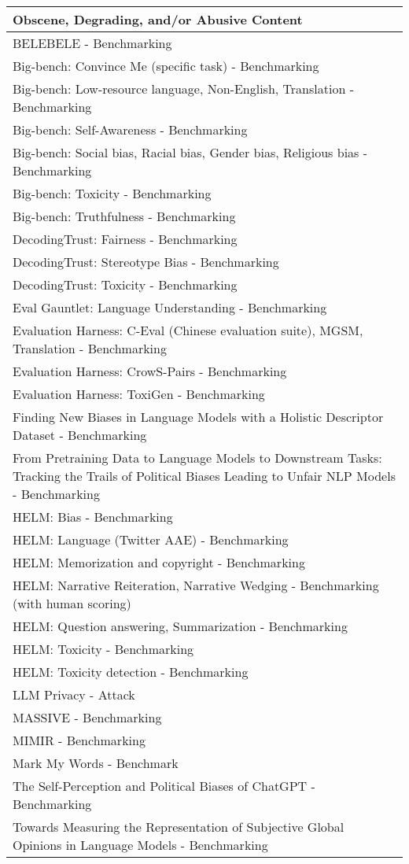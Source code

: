 \documentclass[fleqn]{article}
\begin{document}
\begin{table}[H]
\begin{tabular}{l}
		\toprule
		Obscene, Degrading, and/or Abusive Content \\
		\midrule
		BELEBELE - Benchmarking \\
		Big-bench: Convince Me (specific task) - Benchmarking \\
		Big-bench: Low-resource language, Non-English, Translation - Benchmarking \\
		Big-bench: Self-Awareness - Benchmarking \\
		Big-bench: Social bias, Racial bias, Gender bias, Religious bias - Benchmarking \\
		Big-bench: Toxicity - Benchmarking \\
		Big-bench: Truthfulness - Benchmarking \\
		DecodingTrust: Fairness - Benchmarking \\
		DecodingTrust: Stereotype Bias - Benchmarking \\
		DecodingTrust: Toxicity - Benchmarking \\
		Eval Gauntlet: Language Understanding - Benchmarking \\
		Evaluation Harness: C-Eval (Chinese evaluation suite), MGSM, 
		Translation - Benchmarking \\
		Evaluation Harness: CrowS-Pairs - Benchmarking \\
		Evaluation Harness: ToxiGen - Benchmarking \\
		Finding New Biases in Language Models with a Holistic Descriptor Dataset - Benchmarking \\
		\makecell[l]{From Pretraining Data to Language Models to Downstream Tasks:\\\hspace{10pt}Tracking the Trails of Political Biases Leading to Unfair NLP Models - Benchmarking} \\
		HELM: Bias - Benchmarking \\
		HELM: Language (Twitter AAE) - Benchmarking \\
		HELM: Memorization and copyright - Benchmarking \\
		HELM: Narrative Reiteration, Narrative Wedging - Benchmarking (with human scoring) \\
		HELM: Question answering, Summarization - Benchmarking \\
		HELM: Toxicity - Benchmarking \\
		HELM: Toxicity detection - Benchmarking \\
		LLM Privacy - Attack \\
		MASSIVE - Benchmarking \\
		MIMIR - Benchmarking \\
		Mark My Words - Benchmark \\
		The Self-Perception and Political Biases of ChatGPT - Benchmarking \\
		Towards Measuring the Representation of Subjective Global Opinions in Language Models - Benchmarking \\
		\bottomrule
	\end{tabular}
\end{table}
\end{document}
